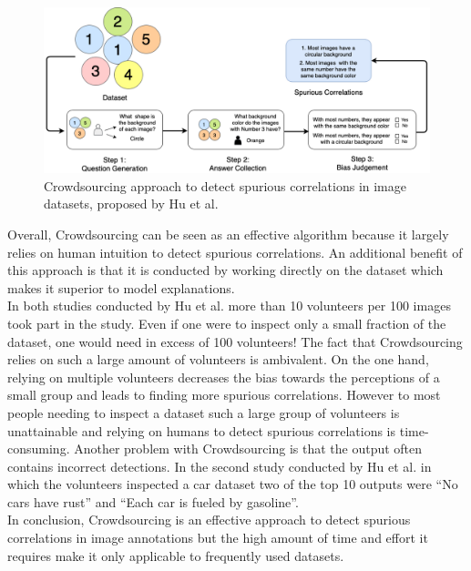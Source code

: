 \documentclass{article}
\begin{document}
\begin{figure}
    \centering
    \includegraphics[scale=0.315]{crowdsourcing.png}
    \caption{Crowdsourcing approach to detect spurious correlations in image datasets, proposed by Hu et al. \cite{10.1145/3366423.3380063}}
    \label{fig:crowdsourcing}
\end{figure}

Overall, Crowdsourcing can be seen as an effective algorithm because it largely relies on human intuition to detect
spurious correlations. An additional benefit of this approach is that it is conducted by working directly
on the dataset which makes it superior to model explanations. \\
In both studies conducted by Hu et al. more than 10 volunteers per 100 images took part in the study.
Even if one were to inspect only a small fraction of the dataset, one would need in excess of 100 volunteers!
The fact that Crowdsourcing relies on such a large amount of volunteers is ambivalent. On the one hand, relying on multiple
volunteers decreases the bias towards the perceptions of a small group and leads to finding more spurious correlations.
However to most people needing to inspect a dataset such a large group of volunteers is unattainable and relying on humans
to detect spurious correlations is time-consuming.
Another problem with Crowdsourcing is that the output often contains incorrect detections.
In the second study conducted by Hu et al. in which the volunteers inspected a car dataset two of the top 10 outputs
were \enquote{No cars have rust} and \enquote{Each car is fueled by gasoline}. \\
In conclusion, Crowdsourcing is an effective approach to detect spurious correlations in image annotations
but the high amount of time and effort it requires make it only applicable to frequently used datasets.
\end{document}
